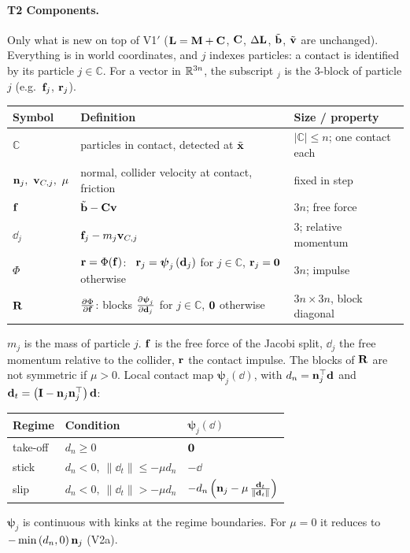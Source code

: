\paragraph{T2 Components.}\mbox{}
\newline Only what is new on top of V1$'$ ($\mathbf{L} = \mathbf{M} + \mathbf{C}$, $\mathbf{C}$, $\Delta\mathbf{L}$, $\tilde{\mathbf{b}}$, $\tilde{\mathbf{v}}$ are unchanged). Everything is in world coordinates, and $j$ indexes particles: a contact is identified by its particle $j \in \mathbb{C}$. For a vector in $\mathbb{R}^{3n}$, the subscript $_j$ is the $3$-block of particle $j$ (e.g.\ $\mathbf{f}_j$, $\mathbf{r}_j$).
\begin{center}
\renewcommand{\arraystretch}{1.4}
\begin{tabular}{lll}
\textbf{Symbol} & \textbf{Definition} & \textbf{Size / property} \\ \hline
$\mathbb{C}$  & particles in contact, detected at $\tilde{\mathbf{x}}$ & $\left|\mathbb{C}\right| \le n$; one contact each \\
$\n_j,\ \vv_{C,j},\ \mu$ & normal, collider velocity at contact, friction & fixed in step \\
$\mathbf{f}$          & $\tilde{\mathbf{b}} - \mathbf{C}\mathbf{v}$ & $3n$; free force \\
$\dd_j$       & $\mathbf{f}_j - m_j\mathbf{v}_{C,j}$ & $3$; relative momentum \\
$\Phi$        & $\mathbf{r} = \Phi(\mathbf{f})$: \ $\mathbf{r}_j = \boldsymbol{\psi}_j\left(\mathbf{d}_j\right)$ for $j \in \mathbb{C}$, $\mathbf{r}_j = \mathbf{0}$ otherwise & $3n$; impulse \\
$\mathbf{R}$          & $\frac{\partial \Phi}{\partial \mathbf{f}}$: blocks $\frac{\partial \boldsymbol{\psi}_j}{\partial \mathbf{d}_j}$ for $j \in \mathbb{C}$, $\mathbf{0}$ otherwise & $3n\times 3n$, block diagonal \\
\end{tabular}
\end{center}
\noindent $m_j$ is the mass of particle $j$. $\mathbf{f}$ is the free force of the Jacobi split, $\dd_j$ the free momentum relative to the collider, $\mathbf{r}$ the contact impulse. The blocks of $\mathbf{R}$ are not symmetric if $\mu > 0$.
\noindent Local contact map $\boldsymbol{\psi}_j(\dd)$, with $d_n = \mathbf{n}_j^\top\mathbf{d}$ and $\mathbf{d}_t = \left(\mathbf{I} - \mathbf{n}_j\mathbf{n}_j^\top\right)\mathbf{d}$:
\begin{center}
\renewcommand{\arraystretch}{1.6}
\begin{tabular}{lll}
\textbf{Regime} & \textbf{Condition} & $\boldsymbol{\psi}_j(\dd)$ \\ \hline
take-off & $d_n \ge 0$ & $\mathbf{0}$ \\
stick    & $d_n < 0,\ \left\|\dd_t\right\| \le -\mu d_n$ & $-\dd$ \\
slip     & $d_n < 0,\ \left\|\dd_t\right\| > -\mu d_n$ & $-d_n\left(\mathbf{n}_j - \mu\,\tfrac{\mathbf{d}_t}{\left\|\mathbf{d}_t\right\|}\right)$ \\
\end{tabular}
\end{center}
\noindent $\boldsymbol{\psi}_j$ is continuous with kinks at the regime boundaries. For $\mu = 0$ it reduces to $-\min\left(d_n, 0\right)\mathbf{n}_j$ (V2a).

